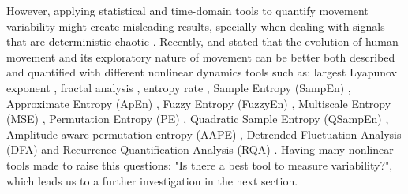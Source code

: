 However, applying statistical and time-domain tools to quantify movement variability 
might create misleading results, specially when dealing with signals that 
are deterministic chaotic \citep{amato1992, dingwell2000, dingwell2007, miller2006}.
Recently, \cite{stergiou2011} and \cite{caballero2014} stated that 
the evolution of human movement and its exploratory nature of movement 
can be better both described and quantified with different nonlinear dynamics tools
such as: 
largest Lyapunov exponent \citep{bruijn2009, donker2007, kurz2010b, yang2011},
fractal analysis \citep{delignleres2003},
entropy rate \citep{cavanaugh2010},
Sample Entropy (SampEn)  \citep{richman2000, donker2007, liao2008, stins2009, vaillancourt2004},
Approximate Entropy (ApEn) \citep{pincus1991, kurz2010a, sosnoff2006, sosnoff2009, cavanaugh2010},
Fuzzy Entropy (FuzzyEn) \citep{chen2007},
Multiscale Entropy (MSE) \citep{costa2002},
Permutation Entropy (PE) \citep{bandt2002, vakharia2015},
Quadratic Sample Entropy (QSampEn) \citep{lake2011},
Amplitude-aware permutation entropy (AAPE) \citep{azami2016},
Detrended Fluctuation Analysis (DFA) \citep{gates2007, gates2008, hausdorff200} and 
Recurrence Quantification Analysis (RQA) \citep{zbilut1992, trulla1996, marwan2008}.
Having many nonlinear tools made \cite[p. 67]{caballero2014} to raise this questions:
"Is there a best tool to measure variability?", which leads us to a further 
investigation in the next section.
%







